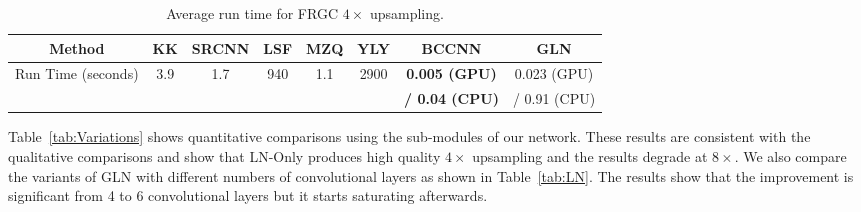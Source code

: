 \documentclass[runningheads]{llncs}
\begin{document}
\begin{table}[t]
    \caption{Average run time for FRGC $4\times$ upsampling.}
    \vspace{-4mm}
    \label{tab:times}
    \centering
    \small
        \begin{tabular}[t]{|c|c|c|c|c|c|c|c|}
        \hline
        Method &
        KK     &
        SRCNN &
        LSF        &
        MZQ      &
        YLY   &
        BCCNN &
        GLN   \\
        \hline
        Run Time (seconds)
        & 3.9
        & 1.7
        & 940
        & 1.1
        & 2900
        & \bf 0.005 (GPU)
        & 0.023 (GPU) \\
        & & & & & & \bf / 0.04 (CPU) & / 0.91 (CPU)\\
        \hline
        \end{tabular}
\end{table}




Table~\ref{tab:Variations} shows quantitative comparisons using the sub-modules of our network. These results are consistent with the qualitative comparisons and show that LN-Only produces high quality $4 \times$ upsampling and the results degrade at $8 \times$. We also compare the variants of GLN with different numbers of convolutional layers as shown in Table~\ref{tab:LN}. The results show that the improvement is significant from 4 to 6 convolutional layers but it starts saturating afterwards.
\end{document}
